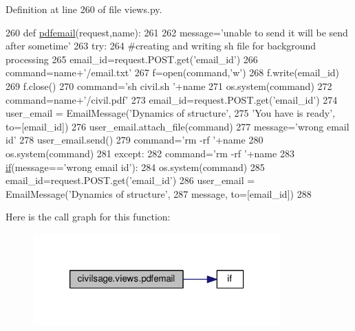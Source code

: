 Definition at line 260 of file views.\+py.


\begin{DoxyCode}
260 \textcolor{keyword}{def }\hyperlink{namespacecivilsage_1_1views_a9914ff19f8e15ccab1a07eaeac8cfb21}{pdfemail}(request,name):
261 
262     message=\textcolor{stringliteral}{'unable to send it will be send after sometime'}
263     \textcolor{keywordflow}{try}:
264         \textcolor{comment}{#creating and writing sh file for background processing}
265         email\_id=request.POST.get(\textcolor{stringliteral}{'email\_id'})
266         command=name+\textcolor{stringliteral}{'/email.txt'}
267         f=open(command,\textcolor{stringliteral}{'w'})
268         f.write(email\_id)
269         f.close()
270         command=\textcolor{stringliteral}{'sh  civil.sh '}+name
271         os.system(command)
272         command=name+\textcolor{stringliteral}{'/civil.pdf'}
273         email\_id=request.POST.get(\textcolor{stringliteral}{'email\_id'})
274         user\_email = EmailMessage(\textcolor{stringliteral}{'Dynamics of structure'},
275         \textcolor{stringliteral}{'You have is ready'}, to=[email\_id])
276         user\_email.attach\_file(command)
277         message=\textcolor{stringliteral}{'wrong email id'}
278         user\_email.send()
279         command=\textcolor{stringliteral}{'rm -rf '}+name
280         os.system(command)
281     \textcolor{keywordflow}{except}:
282         command=\textcolor{stringliteral}{'rm -rf '}+name
283         \hyperlink{bootstrap_8min_8js_ac2d69f5011896c6ed4a54e0dd36f6334}{if}(message==\textcolor{stringliteral}{'wrong email id'}):
284                     os.system(command)
285                 email\_id=request.POST.get(\textcolor{stringliteral}{'email\_id'})
286         user\_email = EmailMessage(\textcolor{stringliteral}{'Dynamics of structure'},
287         message, to=[email\_id])
288 
\end{DoxyCode}


Here is the call graph for this function\+:\nopagebreak
\begin{figure}[H]
\begin{center}
\leavevmode
\includegraphics[width=270pt]{namespacecivilsage_1_1views_a9914ff19f8e15ccab1a07eaeac8cfb21_cgraph}
\end{center}
\end{figure}


